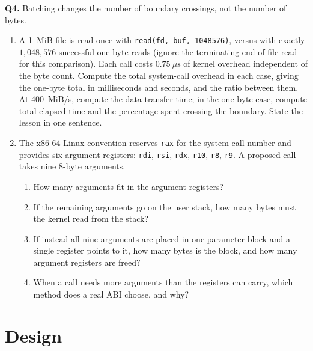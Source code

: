 \documentclass[11pt]{article}
\begin{document}
\textbf{Q4.} Batching changes the number of boundary crossings, not the number of bytes.
\begin{enumerate}
  \item[(a)] A 1~MiB file is read once with \texttt{read(fd, buf, 1048576)}, versus with exactly $1{,}048{,}576$ successful one-byte reads (ignore the terminating end-of-file read for this comparison). Each call costs $0.75~\mu\text{s}$ of kernel overhead independent of the byte count. Compute the total system-call overhead in each case, giving the one-byte total in milliseconds and seconds, and the ratio between them. At 400~MiB/s, compute the data-transfer time; in the one-byte case, compute total elapsed time and the percentage spent crossing the boundary. State the lesson in one sentence.
  \item[(b)] The x86-64 Linux convention reserves \texttt{rax} for the system-call number and provides six argument registers: \texttt{rdi}, \texttt{rsi}, \texttt{rdx}, \texttt{r10}, \texttt{r8}, \texttt{r9}. A proposed call takes nine 8-byte arguments.
  \begin{enumerate}
    \item[(i)] How many arguments fit in the argument registers?
    \item[(ii)] If the remaining arguments go on the user stack, how many bytes must the kernel read from the stack?
    \item[(iii)] If instead all nine arguments are placed in one parameter block and a single register points to it, how many bytes is the block, and how many argument registers are freed?
    \item[(iv)] When a call needs more arguments than the registers can carry, which method does a real ABI choose, and why?
  \end{enumerate}
\end{enumerate}

\section{Design}
\end{document}
